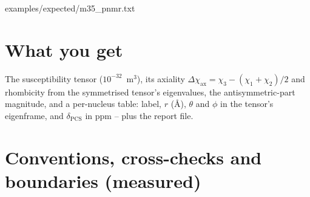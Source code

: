 
  {examples/expected/m35_pnmr.txt}

\section{What you get}

The susceptibility tensor ($10^{-32}$~m$^3$), its axiality
$\Delta\chi_{\mathrm{ax}} = \chi_3 - (\chi_1 + \chi_2)/2$ and rhombicity from
the symmetrised tensor's eigenvalues, the antisymmetric-part magnitude, and a
per-nucleus table: label, $r$ (\AA), $\theta$ and $\phi$ in the tensor's
eigenframe, and $\delta_{\mathrm{PCS}}$ in ppm -- plus the report file.

\section{Conventions, cross-checks and boundaries (measured)}


